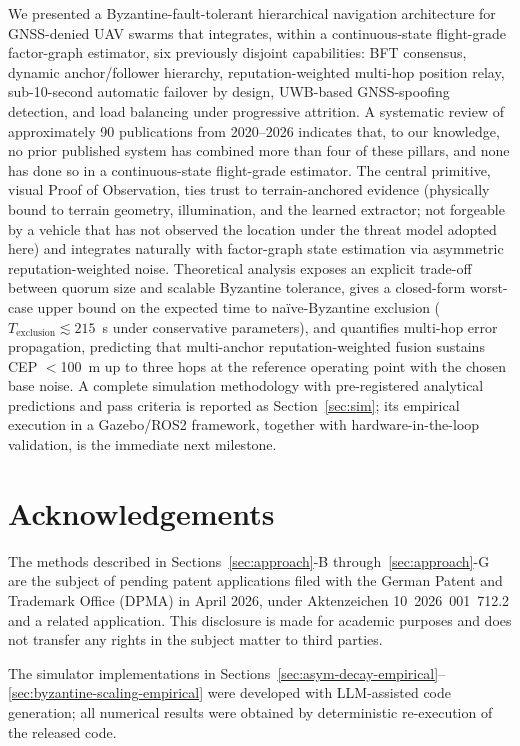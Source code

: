 \documentclass[conference,10pt]{IEEEtran}
\begin{document}
We presented a Byzantine-fault-tolerant hierarchical navigation architecture for GNSS-denied UAV swarms that integrates, within a continuous-state flight-grade factor-graph estimator, six previously disjoint capabilities: BFT consensus, dynamic anchor/follower hierarchy, reputation-weighted multi-hop position relay, sub-10-second automatic failover by design, UWB-based GNSS-spoofing detection, and load balancing under progressive attrition. A systematic review of approximately 90 publications from 2020--2026 indicates that, to our knowledge, no prior published system has combined more than four of these pillars, and none has done so in a continuous-state flight-grade estimator. The central primitive, visual Proof of Observation, ties trust to terrain-anchored evidence (physically bound to terrain geometry, illumination, and the learned extractor; not forgeable by a vehicle that has not observed the location under the threat model adopted here) and integrates naturally with factor-graph state estimation via asymmetric reputation-weighted noise. Theoretical analysis exposes an explicit trade-off between quorum size and scalable Byzantine tolerance, gives a closed-form worst-case upper bound on the expected time to na\"ive-Byzantine exclusion ($T_\text{exclusion}\lesssim 215$~s under conservative parameters), and quantifies multi-hop error propagation, predicting that multi-anchor reputation-weighted fusion sustains CEP $<$100~m up to three hops at the reference operating point with the chosen base noise. A complete simulation methodology with pre-registered analytical predictions and pass criteria is reported as Section~\ref{sec:sim}; its empirical execution in a Gazebo/ROS2 framework, together with hardware-in-the-loop validation, is the immediate next milestone.

\section*{Acknowledgements}
The methods described in Sections~\ref{sec:approach}-B through~\ref{sec:approach}-G are the subject of pending patent applications filed with the German Patent and Trademark Office (DPMA) in April 2026, under Aktenzeichen 10~2026~001~712.2 and a related application. This disclosure is made for academic purposes and does not transfer any rights in the subject matter to third parties.

The simulator implementations in Sections~\ref{sec:asym-decay-empirical}--\ref{sec:byzantine-scaling-empirical} were developed with LLM-assisted code generation; all numerical results were obtained by deterministic re-execution of the released code.
\end{document}
